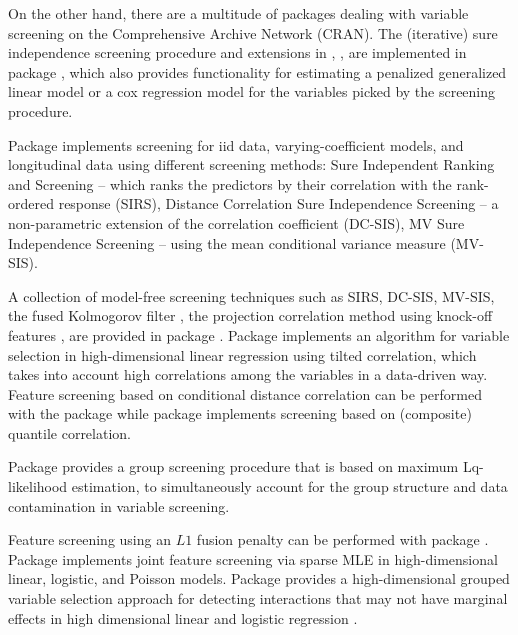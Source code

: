 \documentclass[
  article]{jss}
\begin{document}
On the other hand, there are a multitude of packages dealing with
variable screening on the Comprehensive  Archive Network
(CRAN). The (iterative) sure independence screening procedure and
extensions in \citet{Fan2007SISforUHD}, \citet{Fan2010sisglms},
\citet{fan2010high} are implemented in package  \citep{SISR},
which also provides functionality for estimating a penalized generalized
linear model or a cox regression model for the variables picked by the
screening procedure.

Package  \citep{pkg:VariableScreening} implements
screening for iid data, varying-coefficient models, and longitudinal
data using different screening methods: Sure Independent Ranking and
Screening -- which ranks the predictors by their correlation with the
rank-ordered response (SIRS), Distance Correlation Sure Independence
Screening -- a non-parametric extension of the correlation coefficient
(DC-SIS), MV Sure Independence Screening -- using the mean conditional
variance measure (MV-SIS).

A collection of model-free screening techniques such as SIRS, DC-SIS,
MV-SIS, the fused Kolmogorov filter \citep{mai2015fusedkolmogorov}, the
projection correlation method using knock-off features
\citep{liu2020knockoff}, are provided in package 
\citep{pkg:MFSIS}. Package  \citep{pkg:tilting} implements
an algorithm for variable selection in high-dimensional linear
regression using tilted correlation, which takes into account high
correlations among the variables in a data-driven way. Feature screening
based on conditional distance correlation \citep{wang2015conditional}
can be performed with the  package \citep{pkg:cdcsis} while
package  \citep{pkg:QCSIS} implements screening based on
(composite) quantile correlation.

Package  \citep{pkg:LqG} provides a group screening procedure
that is based on maximum Lq-likelihood estimation, to simultaneously
account for the group structure and data contamination in variable
screening.

Feature screening using an \(L1\) fusion penalty can be performed with
package  \citep{pkg:fusionclust}. Package 
\citep{pkg:SMLE} implements joint feature screening via sparse MLE
\citep{SMLE2014} in high-dimensional linear, logistic, and Poisson
models. Package  \citep{pkg:TSGSIS} provides a
high-dimensional grouped variable selection approach for detecting
interactions that may not have marginal effects in high dimensional
linear and logistic regression \citep{10.1093/bioinformatics/btx409}.
\end{document}
